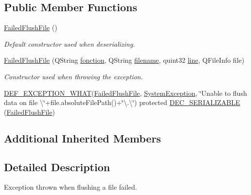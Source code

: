 \subsection*{Public Member Functions}
\begin{DoxyCompactItemize}
\item 
\hyperlink{class_gost_crypt_1_1_failed_flush_file_acd0db141f4a0df80ca3b1200f0d74f17}{Failed\+Flush\+File} ()
\begin{DoxyCompactList}\small\item\em Default constructor used when deserializing. \end{DoxyCompactList}\item 
\hyperlink{class_gost_crypt_1_1_failed_flush_file_add4ac7354fd7c5a177e9360961d2f731}{Failed\+Flush\+File} (Q\+String \hyperlink{class_gost_crypt_1_1_gost_crypt_exception_a29b8c93d5efbb1ff369107385725a939}{fonction}, Q\+String \hyperlink{class_gost_crypt_1_1_gost_crypt_exception_a749a12375f4ba9d502623b99d8252f38}{filename}, quint32 \hyperlink{class_gost_crypt_1_1_gost_crypt_exception_abf506d911f12a4e969eea500f90bd32c}{line}, Q\+File\+Info file)
\begin{DoxyCompactList}\small\item\em Constructor used when throwing the exception. \end{DoxyCompactList}\item 
\hyperlink{_gost_crypt_exception_8h_a5bc1e1c6c9d6f46c84eeba49e33355f9}{D\+E\+F\+\_\+\+E\+X\+C\+E\+P\+T\+I\+O\+N\+\_\+\+W\+H\+AT}(\hyperlink{class_gost_crypt_1_1_failed_flush_file}{Failed\+Flush\+File}, \hyperlink{class_gost_crypt_1_1_system_exception}{System\+Exception}, \char`\"{}Unable to flush data on file \textbackslash{}\char`\"{}+file.\+absolute\+File\+Path()+\char`\"{}\textbackslash{}.\textbackslash{}\char`\"{}) protected \hyperlink{class_gost_crypt_1_1_failed_flush_file_af4e7a4b86ea666acec3006d0b252194a}{D\+E\+C\+\_\+\+S\+E\+R\+I\+A\+L\+I\+Z\+A\+B\+LE} (\hyperlink{class_gost_crypt_1_1_failed_flush_file}{Failed\+Flush\+File})
\end{DoxyCompactItemize}
\subsection*{Additional Inherited Members}


\subsection{Detailed Description}
Exception thrown when flushing a file failed. 

